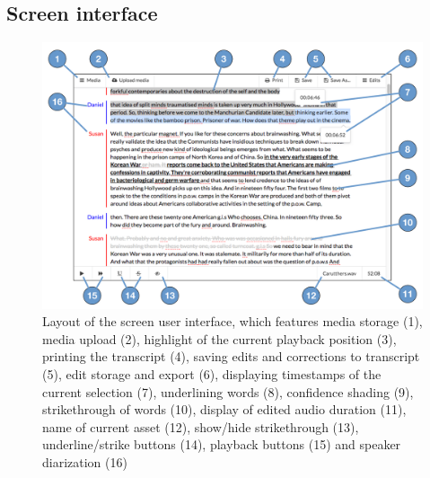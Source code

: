 


\subsection{Screen interface}\label{sec:paper-screen-design}

\begin{figure}[p]
  \centering
  \includegraphics[width=\columnwidth]{figs/discourse-interface-labelled.pdf}
  \caption[Layout of the screen user interface.]{Layout of the screen user interface, which features 
    media storage (1),
    media upload (2),
    highlight of the current playback position (3),
    printing the transcript (4),
    saving edits and corrections to transcript (5),
    edit storage and export (6),
    displaying timestamps of the current selection (7),
    underlining words (8),
    confidence shading (9),
    strikethrough of words (10),
    display of edited audio duration (11),
    name of current asset (12),
    show/hide strikethrough (13),
    underline/strike buttons (14),
    playback buttons (15)
  and speaker diarization (16)}
  \label{fig:dialogger-interface}
\end{figure}

